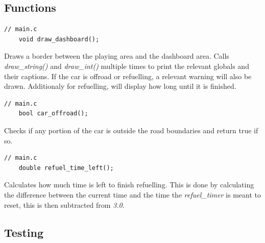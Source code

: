 \documentclass{article}
\begin{document}
\subsection*{Functions}
\begin{lstlisting}[style=CStyle]
	// main.c
	void draw_dashboard();
\end{lstlisting}
Draws a border between the playing area and the dashboard area. Calls \emph{draw\_string()} and \emph{draw\_int()} multiple times to print the relevant globals and their captions.
\newline
If the car is offroad or refuelling, a relevant warning will also be drawn. Additionaly for refuelling, will display how long until it is finished.
\newline
\begin{lstlisting}[style=CStyle]
	// main.c
	bool car_offroad();
\end{lstlisting}
Checks if any portion of the car is outside the road boundaries and return true if so.
\begin{lstlisting}[style=CStyle]
	// main.c
	double refuel_time_left();
\end{lstlisting}
Calculates how much time is left to finish refuelling. This is done by calculating the difference between the current time and the time the \emph{refuel\_timer} is meant to reset, this is then subtracted from \emph{3.0}.
\newline

\subsection*{Testing}
\end{document}
